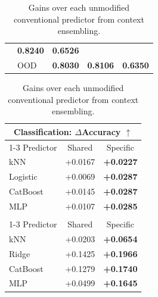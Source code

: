 \begin{table}[H]
\begin{minipage}[t]{0.61\textwidth}
\begin{tabular}{@{}llccc@{}}
        & \textcolor{revisionblue}{\textbf{0.8240}}
        & \textcolor{revisionblue}{\textbf{0.6526}} \\
           & OOD
        & \textcolor{revisionblue}{\textbf{0.8030}}
        & \textcolor{revisionblue}{\textbf{0.8106}}
        & \textcolor{revisionblue}{\textbf{0.6350}} \\
      \bottomrule
    \end{tabular}
  \end{minipage}\hfill
  \begin{minipage}[t]{0.36\textwidth}
    \vspace{0pt}
    \centering
    \caption{Gains over each unmodified conventional predictor from context ensembling.}
    \label{tab:traditional-backbone-gains}
    \small
    \setlength{\tabcolsep}{4.0pt}
    \renewcommand{\arraystretch}{1.02}
    \begin{tabular}{@{}lcc@{}}
      \toprule
      \multicolumn{3}{c}{Classification: $\Delta$Accuracy $\uparrow$} \\
      \cmidrule(lr){1-3}
      Predictor & Shared & Specific \\
      \midrule
      kNN & \textcolor{sharedblue}{+0.0167}
        & \textcolor{specificred}{\textbf{+0.0227}} \\
      Logistic & \textcolor{sharedblue}{+0.0069}
        & \textcolor{specificred}{\textbf{+0.0287}} \\
      CatBoost & \textcolor{sharedblue}{+0.0145}
        & \textcolor{specificred}{\textbf{+0.0287}} \\
      MLP & \textcolor{sharedblue}{+0.0107}
        & \textcolor{specificred}{\textbf{+0.0285}} \\
      \addlinespace[5pt]
      \multicolumn{3}{c}{Regression: $\Delta R^2$ $\uparrow$} \\
      \cmidrule(lr){1-3}
      Predictor & Shared & Specific \\
      \midrule
      kNN & \textcolor{sharedblue}{+0.0203}
        & \textcolor{specificred}{\textbf{+0.0654}} \\
      Ridge & \textcolor{sharedblue}{+0.1425}
        & \textcolor{specificred}{\textbf{+0.1966}} \\
      CatBoost & \textcolor{sharedblue}{+0.1279}
        & \textcolor{specificred}{\textbf{+0.1740}} \\
      MLP & \textcolor{sharedblue}{+0.0499}
        & \textcolor{specificred}{\textbf{+0.1645}} \\
      \bottomrule
    \end{tabular}
  \end{minipage}
\end{table}
